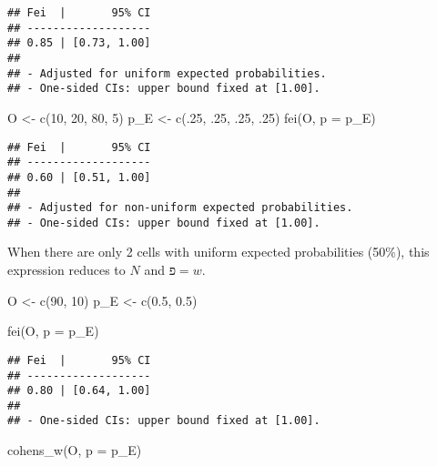 \documentclass[
]{article}
\newenvironment{Shaded}{\begin{snugshade}}{\end{snugshade}}
\newcommand{\AttributeTok}[1]{\textcolor[rgb]{0.77,0.63,0.00}{#1}}
\newcommand{\DecValTok}[1]{\textcolor[rgb]{0.00,0.00,0.81}{#1}}
\newcommand{\FloatTok}[1]{\textcolor[rgb]{0.00,0.00,0.81}{#1}}
\newcommand{\FunctionTok}[1]{\textcolor[rgb]{0.00,0.00,0.00}{#1}}
\newcommand{\NormalTok}[1]{#1}
\newcommand{\OtherTok}[1]{\textcolor[rgb]{0.56,0.35,0.01}{#1}}
\begin{document}
\begin{verbatim}
## Fei  |       95% CI
## -------------------
## 0.85 | [0.73, 1.00]
## 
## - Adjusted for uniform expected probabilities.
## - One-sided CIs: upper bound fixed at [1.00].
\end{verbatim}

\begin{Shaded}
\begin{Highlighting}[]
\NormalTok{O }\OtherTok{\textless{}{-}} \FunctionTok{c}\NormalTok{(}\DecValTok{10}\NormalTok{, }\DecValTok{20}\NormalTok{, }\DecValTok{80}\NormalTok{, }\DecValTok{5}\NormalTok{)}
\NormalTok{p\_E }\OtherTok{\textless{}{-}} \FunctionTok{c}\NormalTok{(.}\DecValTok{25}\NormalTok{, .}\DecValTok{25}\NormalTok{, .}\DecValTok{25}\NormalTok{, .}\DecValTok{25}\NormalTok{)}
\FunctionTok{fei}\NormalTok{(O, }\AttributeTok{p =}\NormalTok{ p\_E)}
\end{Highlighting}
\end{Shaded}

\begin{verbatim}
## Fei  |       95% CI
## -------------------
## 0.60 | [0.51, 1.00]
## 
## - Adjusted for non-uniform expected probabilities.
## - One-sided CIs: upper bound fixed at [1.00].
\end{verbatim}

When there are only 2 cells with uniform expected probabilities (50\%),
this expression reduces to \(N\) and \(פ = w\).

\begin{Shaded}
\begin{Highlighting}[]
\NormalTok{O }\OtherTok{\textless{}{-}} \FunctionTok{c}\NormalTok{(}\DecValTok{90}\NormalTok{, }\DecValTok{10}\NormalTok{)}
\NormalTok{p\_E }\OtherTok{\textless{}{-}} \FunctionTok{c}\NormalTok{(}\FloatTok{0.5}\NormalTok{, }\FloatTok{0.5}\NormalTok{)}

\FunctionTok{fei}\NormalTok{(O, }\AttributeTok{p =}\NormalTok{ p\_E)}
\end{Highlighting}
\end{Shaded}

\begin{verbatim}
## Fei  |       95% CI
## -------------------
## 0.80 | [0.64, 1.00]
## 
## - One-sided CIs: upper bound fixed at [1.00].
\end{verbatim}

\begin{Shaded}
\begin{Highlighting}[]
\FunctionTok{cohens\_w}\NormalTok{(O, }\AttributeTok{p =}\NormalTok{ p\_E)}
\end{Highlighting}
\end{Shaded}
\end{document}
